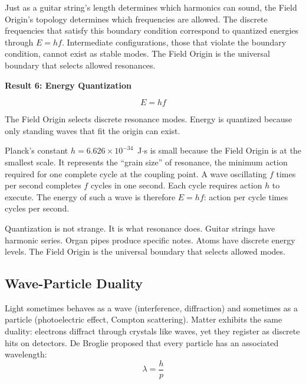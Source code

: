 \documentclass[aps,prd,preprint,superscriptaddress,showpacs,preprintnumbers,amsmath,amssymb,nofootinbib]{revtex4-2}
\begin{document}
Just as a guitar string's length determines which harmonics can sound, the Field Origin's topology determines which frequencies are allowed. The discrete frequencies that satisfy this boundary condition correspond to quantized energies through $E = hf$. Intermediate configurations, those that violate the boundary condition, cannot exist as stable modes. The Field Origin is the universal boundary that selects allowed resonances.

\vspace{1.5em}
\noindent
\colorbox{resultgreen}{\parbox{\dimexpr\textwidth-2\fboxsep\relax}{%
\vspace{0.8em}
\centering
\textbf{\large Result 6: Energy Quantization}

\vspace{0.5em}
\boldmath
\begin{equation}
E = hf
\end{equation}
\unboldmath

\vspace{0.3em}
The Field Origin selects discrete resonance modes. Energy is quantized because only standing waves that fit the origin can exist.
\vspace{0.5em}
}}
\vspace{1cm}

Planck's constant $h = 6.626 \times 10^{-34}$~J$\cdot$s is small because the Field Origin is at the smallest scale. It represents the ``grain size'' of resonance, the minimum action required for one complete cycle at the coupling point. A wave oscillating $f$ times per second completes $f$ cycles in one second. Each cycle requires action $h$ to execute. The energy of such a wave is therefore $E = hf$: action per cycle times cycles per second.

Quantization is not strange. It is what resonance does. Guitar strings have harmonic series. Organ pipes produce specific notes. Atoms have discrete energy levels. The Field Origin is the universal boundary that selects allowed modes.

\subsection{Wave-Particle Duality}
\label{subsec:debroglie}

Light sometimes behaves as a wave (interference, diffraction) and sometimes as a particle (photoelectric effect, Compton scattering). Matter exhibits the same duality: electrons diffract through crystals like waves, yet they register as discrete hits on detectors. De Broglie proposed that every particle has an associated wavelength:
\begin{equation}
\lambda = \frac{h}{p}
\end{equation}
\end{document}
